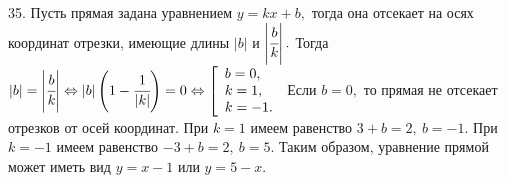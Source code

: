 35. Пусть прямая задана уравнением $y=kx+b,$ тогда она отсекает на осях координат отрезки, имеющие длины $|b|$ и $\left|\cfrac{b}{k}\right|.$ Тогда
$|b|=\left|\cfrac{b}{k}\right|\Leftrightarrow |b|\left(1-\cfrac{1}{|k|}\right)=0\Leftrightarrow
\left[\begin{array}{l}b=0,\\ k=1,\\ k=-1.\end{array}\right.$ Если $b=0,$ то прямая не отсекает отрезков от осей координат. При $k=1$ имеем равенство $3+b=2,\ b=-1.$
При $k=-1$ имеем равенство $-3+b=2,\ b=5.$ Таким образом, уравнение прямой может иметь вид $y=x-1$ или $y=5-x.$\\
